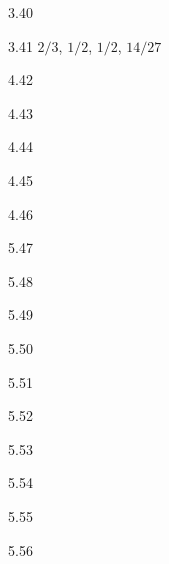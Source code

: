 \protect \hypertarget {soln:3.40}{}
\begin{solution}{{3.40}}
\end{solution}
\protect \hypertarget {soln:3.41}{}
\begin{solution}{{3.41}}
$ 2/3 $, $1/2$, $ 1/2 $, $ 14/27 $
\end{solution}
\protect \hypertarget {soln:4.42}{}
\begin{solution}{{4.42}}
\end{solution}
\protect \hypertarget {soln:4.43}{}
\begin{solution}{{4.43}}
\end{solution}
\protect \hypertarget {soln:4.44}{}
\begin{solution}{{4.44}}
\end{solution}
\protect \hypertarget {soln:4.45}{}
\begin{solution}{{4.45}}
\end{solution}
\protect \hypertarget {soln:4.46}{}
\begin{solution}{{4.46}}
\end{solution}
\protect \hypertarget {soln:5.47}{}
\begin{solution}{{5.47}}
\end{solution}
\protect \hypertarget {soln:5.48}{}
\begin{solution}{{5.48}}
\end{solution}
\protect \hypertarget {soln:5.49}{}
\begin{solution}{{5.49}}
\end{solution}
\protect \hypertarget {soln:5.50}{}
\begin{solution}{{5.50}}
\end{solution}
\protect \hypertarget {soln:5.51}{}
\begin{solution}{{5.51}}
\end{solution}
\protect \hypertarget {soln:5.52}{}
\begin{solution}{{5.52}}
\end{solution}
\protect \hypertarget {soln:5.53}{}
\begin{solution}{{5.53}}
\end{solution}
\protect \hypertarget {soln:5.54}{}
\begin{solution}{{5.54}}
\end{solution}
\protect \hypertarget {soln:5.55}{}
\begin{solution}{{5.55}}
\end{solution}
\protect \hypertarget {soln:5.56}{}
\begin{solution}{{5.56}}
\end{solution}
